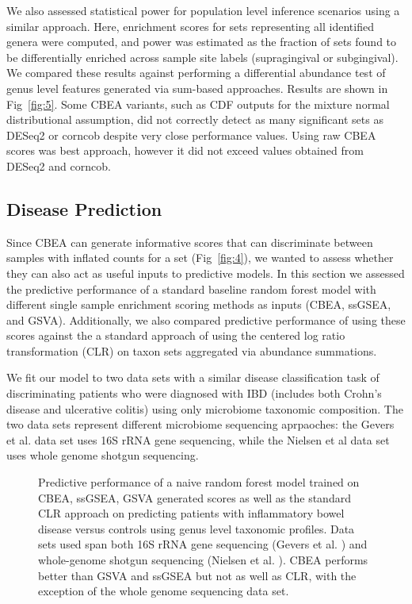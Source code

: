 We also assessed statistical power for population level inference scenarios using a similar approach. Here, enrichment scores for sets representing all identified genera were computed, and power was estimated as the fraction of sets found to be differentially enriched across sample site labels (supragingival or subgingival). We compared these results against performing a differential abundance test of genus level features generated via sum-based approaches. Results are shown in Fig~\ref{fig:5}. Some CBEA variants, such as CDF outputs for the mixture normal distributional assumption, did not correctly detect as many significant sets as DESeq2 or corncob despite very close performance values. Using raw CBEA scores was best approach, however it did not exceed values obtained from DESeq2 and corncob. 

\subsection{Disease Prediction}   
Since CBEA can generate informative scores that can discriminate between samples with inflated counts for a set (Fig~\ref{fig:4}), we wanted to assess whether they can also act as useful inputs to predictive models. In this section we assessed the predictive performance of a standard baseline random forest model \cite{breiman2001} with different single sample enrichment scoring methods as inputs (CBEA, ssGSEA, and GSVA). Additionally, we also compared predictive performance of using these scores against the a standard approach of using the centered log ratio transformation (CLR) on taxon sets aggregated via abundance summations.     

We fit our model to two data sets with a similar disease classification task of discriminating patients who were diagnosed with IBD (includes both Crohn's disease and ulcerative colitis) using only microbiome taxonomic composition. The two data sets represent different microbiome sequencing aprpaoches: the Gevers et al. \cite{gevers2014} data set uses 16S rRNA gene sequencing, while the Nielsen et al \cite{nielsen2014} data set uses whole genome shotgun sequencing. 

\begin{figure}[!h]
    \centering
    \caption{Predictive performance of a naive random forest model trained on CBEA, ssGSEA, GSVA generated scores as well as the standard CLR approach on predicting patients with inflammatory bowel disease versus controls using genus level taxonomic profiles. Data sets used span both 16S rRNA gene sequencing (Gevers et al. \cite{gevers2014}) and whole-genome shotgun sequencing (Nielsen et al. \cite{nielsen2014}). CBEA performs better than GSVA and ssGSEA but not as well as CLR, with the exception of the whole genome sequencing data set.}
    \label{fig:6}
\end{figure}

